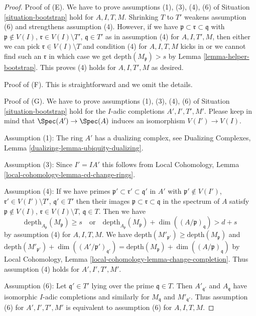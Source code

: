\begin{proof}
Proof of (E). We have to prove assumptions (1), (3), (4), (6)
of Situation \ref{situation-bootstrap} hold for
$A, I, T, M$. Shrinking $T$ to $T'$
weakens assumption (6) and strengthens assumption (4). However, if we have
$\mathfrak p \subset \mathfrak r \subset \mathfrak q$ with
$\mathfrak p \not \in V(I)$, $\mathfrak r \in V(I) \setminus T'$,
$\mathfrak q \in T'$ as in assumption (4) for $A, I, T', M$, then
either we can pick $\mathfrak r \in V(I) \setminus T$ and
condition (4) for $A, I, T, M$ kicks in or we cannot
find such an $\mathfrak r$ in which case we get
$\text{depth}(M_\mathfrak p) > s$ by Lemma \ref{lemma-helper-bootstrap}.
This proves (4) holds for $A, I, T', M$ as desired.

\medskip\noindent
Proof of (F). This is straightforward and we omit the details.

\medskip\noindent
Proof of (G). We have to prove assumptions (1), (3), (4), (6)
of Situation \ref{situation-bootstrap} hold for the $I$-adic
completions $A', I', T', M'$. Please keep in mind that
$\Spec(A') \to \Spec(A)$ induces an isomorphism $V(I') \to V(I)$.

\medskip\noindent
Assumption (1): The ring $A'$ has a dualizing complex, see
Dualizing Complexes, Lemma \ref{dualizing-lemma-ubiquity-dualizing}.

\medskip\noindent
Assumption (3): Since $I' = IA'$ this follows from Local Cohomology,
Lemma \ref{local-cohomology-lemma-cd-change-rings}.

\medskip\noindent
Assumption (4): If we have primes
$\mathfrak p' \subset \mathfrak r' \subset \mathfrak q'$ in $A'$
with $\mathfrak p' \not \in V(I')$,
$\mathfrak r' \in V(I') \setminus T'$,
$\mathfrak q' \in T'$ then their images
$\mathfrak p \subset \mathfrak r \subset \mathfrak q$ in
the spectrum of $A$
satisfy
$\mathfrak p \not \in V(I)$, $\mathfrak r \in V(I) \setminus T$,
$\mathfrak q \in T$.
Then we have
$$
\text{depth}_{A_\mathfrak p}(M_\mathfrak p) \geq s
\quad\text{or}\quad
\text{depth}_{A_\mathfrak p}(M_\mathfrak p) +
\dim((A/\mathfrak p)_\mathfrak q) > d + s
$$
by assumption (4) for $A, I, T, M$. We have
$\text{depth}(M'_{\mathfrak p'}) \geq \text{depth}(M_\mathfrak p)$ and
$\text{depth}(M'_{\mathfrak p'}) +
\dim((A'/\mathfrak p')_{\mathfrak q'}) =
\text{depth}(M_\mathfrak p) +
\dim((A/\mathfrak p)_\mathfrak q)$
by Local Cohomology, Lemma \ref{local-cohomology-lemma-change-completion}.
Thus assumption (4) holds for $A', I', T', M'$.

\medskip\noindent
Assumption (6): Let $\mathfrak q' \in T'$ lying over the
prime $\mathfrak q \in T$. Then $A'_{\mathfrak q'}$
and $A_\mathfrak q$ have isomorphic $I$-adic completions
and similarly for $M_\mathfrak q$ and $M'_{\mathfrak q'}$.
Thus assumption (6) for $A', I', T', M'$ is equivalent
to assumption (6) for $A, I, T, M$.


\end{proof}
